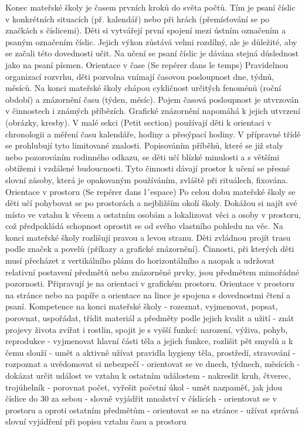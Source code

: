 		Konec mateřské školy je časem prvních kroků do světa počtů. 
		Tím je psaní číslic v konkrétních situacích (př. kalendář) nebo při hrách (přemísťování se po značkách s číslicemi). Děti si vytvářejí první spojení mezi ústním označením a psaným označením číslic. Jejich výkon zůstává velmi rozdílný, ale je důležité, aby se začali této dovednosti učit. Na učení se psaní číslic je dávána stejná důslednost jako na psaní písmen. 
		Orientace v čase (Se repérer dans le temps)
		Pravidelnou organizací rozvrhu, děti pozvolna vnímají časovou posloupnost dne, týdnů, měsíců. Na konci mateřské školy chápou cykličnost určitých fenoménů (roční období) a znázornění času (týden, měsíc). Pojem časová posloupnost je utvrzován v činnostech i známých příbězích. Grafické znázornění napomáhá k jejich utvrzení (obrázky, kresby).
		V malé sekci (Petit section) používají děti k orientaci v chronologii a měření času kalendáře, hodiny a přesýpací hodiny. V přípravné třídě se prohlubují tyto limitované znalosti. Popisováním příběhů, které se již staly nebo pozorováním rodinného odkazu, se děti učí blízké minulosti a s většími obtížemi i vzdálené budoucnosti.
		Tyto činnosti dávají prostor k učení se přesné slovní zásoby, která je opakovaným používáním, zvláště při rituálech, fixována.
		Orientace v prostoru (Se repérer dans l´espace)
		Po celou dobu mateřské školy se děti učí pohybovat se po prostorách a nejbližším okolí školy. Dokážou si najít své místo ve vztahu k věcem a ostatním osobám a lokalizovat věci a osoby v prostoru, což předpokládá schopnost oprostit se od svého vlastního pohledu na věc. Na konci mateřské školy rozlišují pravou a levou stranu. Děti zvládnou projít trasu podle značek a povelů (příkazy a grafické znázornění).
		Činnosti, při kterých děti musí přecházet z vertikálního plánu do horizontálního a naopak a udržovat relativní postavení předmětů nebo znázorněné prvky, jsou předmětem mimořádné pozornosti. Připravují je na orientaci v grafickém prostoru. Orientace v prostoru na stránce nebo na papíře a orientace na lince je spojena s dovednostmi čtení a psaní. 
		Kompetence na konci mateřské školy
		- rozeznat, vyjmenovat, popsat, porovnat, uspořádat, třídit materiál a předměty podle jejich kvalit a užití
		- znát projevy života zvířat i rostlin, spojit je s vyšší funkcí: narození, výživa, pohyb, reprodukce
		- vyjmenovat hlavní části těla a jejich funkce, rozlišit pět smyslů a k čemu slouží
		- umět a aktivně užívat pravidla hygieny těla, prostředí, stravování
		- rozpoznat a uvědomovat si nebezpečí
		- orientovat se ve dnech, týdnech, měsících
		- dokázat určit událost ve vztahu k ostatním událostem
		- nakreslit kruh, čtverec, trojúhelník
		- porovnat počet, vyřešit početní úkol
		- umět nazpaměť, jak jdou číslice do 30 za sebou 
		- slovně vyjádřit  množství v číslicích 
		- orientovat se v prostoru a oproti ostatním předmětům
		- orientovat se na stránce
		- užívat správná slovní vyjádření při popisu vztahu času a prostoru

